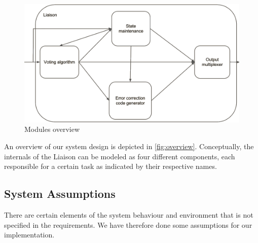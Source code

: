 \begin{figure}[h]
\includegraphics[width=15cm]{design/fig_overview}
\caption{Modules overview}
\label{fig:overview}
\end{figure}

An overview of our system design is depicted in
\autoref{fig:overview}. Conceptually, the internals of the Liaison can
be modeled as four different components, each responsible for a
certain task as indicated by their respective names.

\subsection{System Assumptions}
There are certain elements of the system behaviour and environment
that is not specified in the requirements. We have therefore done some
assumptions for our implementation.

